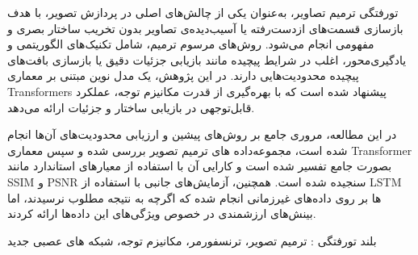 


‌تورفتگی
ترمیم تصاویر، به‌عنوان یکی از چالش‌های اصلی در پردازش تصویر، با هدف بازسازی قسمت‌های از‌دست‌رفته یا آسیب‌دیده‌ی تصاویر بدون تخریب ساختار بصری و مفهومی انجام می‌شود. روش‌های مرسوم ترمیم، شامل تکنیک‌های الگوریتمی و یادگیری‌محور، اغلب در شرایط پیچیده مانند بازیابی جزئیات دقیق یا بازسازی بافت‌های پیچیده محدودیت‌هایی دارند. در این پژوهش، یک مدل نوین مبتنی بر معماری Transformers پیشنهاد شده است که با بهره‌گیری از قدرت مکانیزم توجه، عملکرد قابل‌توجهی در بازیابی ساختار و جزئیات ارائه می‌دهد.


در این مطالعه، مروری  جامع بر روش‌های پیشین و ارزیابی محدودیت‌های آن‌ها انجام شده است، مجموعه‌داده های ترمیم تصویر بررسی شده و سپس معماری Transformer بصورت جامع تفسیر شده است و کارایی آن با استفاده از معیارهای استاندارد مانند SSIM و PSNR سنجیده شده است. همچنین، آزمایش‌های جانبی با استفاده از LSTM‌ ها بر روی داده‌های غیرزمانی انجام شده که اگرچه به نتیجه مطلوب نرسیدند، اما بینش‌های ارزشمندی در خصوص ویژگی‌های این داده‌ها ارائه کردند. 


‌بلند
‌تورفتگی : 
ترمیم تصویر، ترنسفورمر، مکانیزم توجه، شبکه های عصبی
‌جدید
